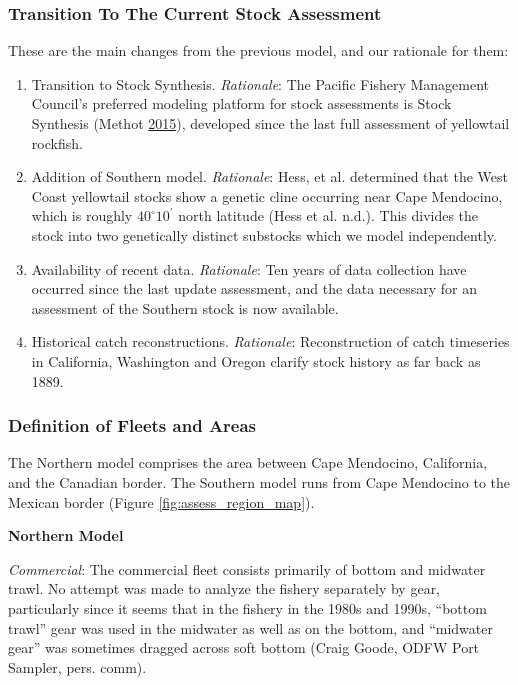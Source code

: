 \documentclass[12pt,]{article}
\begin{document}
\subsubsection{Transition To The Current Stock
Assessment}\label{transition-to-the-current-stock-assessment}

These are the main changes from the previous model, and our rationale
for them:

\begin{enumerate}
\def\labelenumi{\arabic{enumi}.}
\item
  Transition to Stock Synthesis. \emph{Rationale}: The Pacific Fishery
  Management Council's preferred modeling platform for stock assessments
  is Stock Synthesis (Methot \protect\hyperlink{ref-Methot2015}{2015}),
  developed since the last full assessment of yellowtail rockfish.
\item
  Addition of Southern model. \emph{Rationale}: Hess, et al. determined
  that the West Coast yellowtail stocks show a genetic cline occurring
  near Cape Mendocino, which is roughly \(40^\circ 10^\prime\) north
  latitude (Hess et al. n.d.). This divides the stock into two
  genetically distinct substocks which we model independently.
\item
  Availability of recent data. \emph{Rationale}: Ten years of data
  collection have occurred since the last update assessment, and the
  data necessary for an assessment of the Southern stock is now
  available.
\item
  Historical catch reconstructions. \emph{Rationale}: Reconstruction of
  catch timeseries in California, Washington and Oregon clarify stock
  history as far back as 1889.
\end{enumerate}

\subsubsection{Definition of Fleets and
Areas}\label{definition-of-fleets-and-areas}

The Northern model comprises the area between Cape Mendocino,
California, and the Canadian border. The Southern model runs from Cape
Mendocino to the Mexican border (Figure \ref{fig:assess_region_map}).

\textbf{Northern Model}

\emph{Commercial}: The commercial fleet consists primarily of bottom and
midwater trawl. No attempt was made to analyze the fishery separately by
gear, particularly since it seems that in the fishery in the 1980s and
1990s, ``bottom trawl'' gear was used in the midwater as well as on the
bottom, and ``midwater gear'' was sometimes dragged across soft bottom
(Craig Goode, ODFW Port Sampler, pers. comm).
\end{document}
